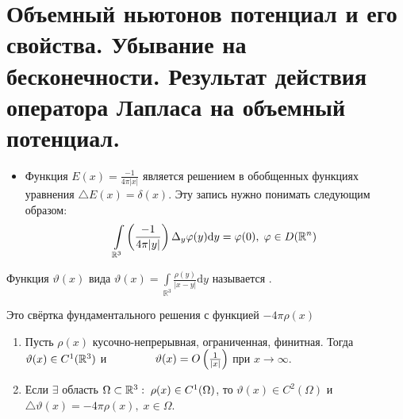 \section{Объемный ньютонов потенциал и его свойства. Убывание на бесконечности. Результат
действия оператора Лапласа на объемный потенциал.}

\begin{itemize}
	\item Функция $E(x) = \frac{-1}{4\pi|x|}$ является решением в обобщенных функциях уравнения $\triangle E(x) = \delta (x)$. Эту запись нужно понимать следующим образом:
    $$
    \int\limits_{\mathbb{R}^3}\left(\frac{-1}{4\pi|y|}\right)\Delta_y \varphi (y) \mathrm{d}y = \varphi(0),\; \varphi \in D(\mathbb{R}^n)
    $$
\end{itemize}

\begin{definition}
	Функция $\vartheta (x)$ вида $\vartheta (x) = \int\limits_{\mathbb{R}^3}\frac{\rho (y)}{|x-y|}\mathrm{d}y$ называется \underline{\it {}}.
\end{definition}

\begin{remark} 
Это свёртка фундаментального решения с функцией $-4\pi\rho (x)$
\end{remark}

\begin{theorem}

	\begin{enumerate}
		\item Пусть $\rho (x)$ \text{---} кусочно-непрерывная, ограниченная, финитная. Тогда $\vartheta (x) \in C^1(\mathbb{R}^3)$ и $\qquad \qquad \vartheta (x) = O\left(\frac{1}{|x|}\right)$ при $x\rightarrow \infty $.
        \item Если $\exists$ область $\Omega \subset \mathbb{R}^3: \;\rho (x) \in C^1(\Omega)$, то $\vartheta (x) \in C^2 (\Omega)$ и $\triangle \vartheta (x) = -4\pi \rho (x), \;x \in \Omega$.
	\end{enumerate}
\end{theorem}

